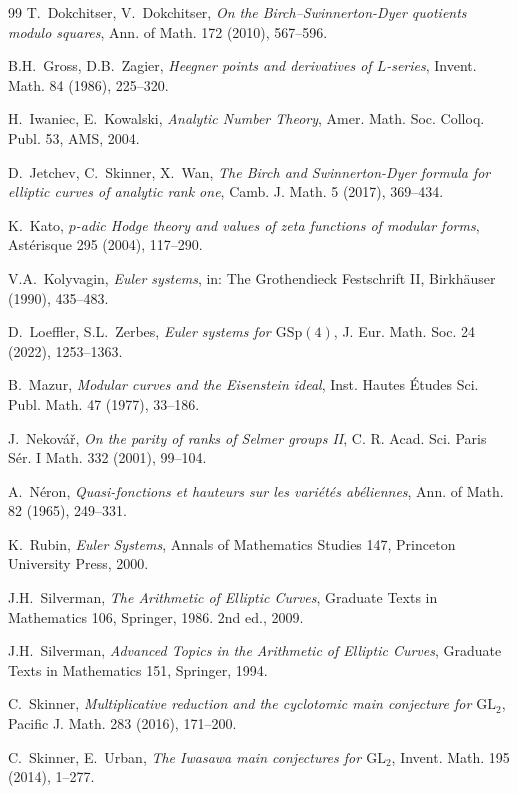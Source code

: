 \documentclass[11pt]{article}
\begin{document}
\begin{thebibliography}{99}
T.~Dokchitser, V.~Dokchitser,
\textit{On the Birch--Swinnerton-Dyer quotients modulo squares},
Ann. of Math. 172 (2010), 567--596.

B.H.~Gross, D.B.~Zagier,
\textit{Heegner points and derivatives of $L$-series},
Invent. Math. 84 (1986), 225--320.

H.~Iwaniec, E.~Kowalski,
\textit{Analytic Number Theory},
Amer. Math. Soc. Colloq. Publ. 53, AMS, 2004.

D.~Jetchev, C.~Skinner, X.~Wan,
\textit{The Birch and Swinnerton-Dyer formula for elliptic curves of analytic
rank one},
Camb. J. Math. 5 (2017), 369--434.

K.~Kato,
\textit{$p$-adic Hodge theory and values of zeta functions of modular
forms},
Ast\'erisque 295 (2004), 117--290.

V.A.~Kolyvagin,
\textit{Euler systems},
in: The Grothendieck Festschrift II,
Birkh\"auser (1990), 435--483.

D.~Loeffler, S.L.~Zerbes,
\textit{Euler systems for $\mathrm{GSp}(4)$},
J. Eur. Math. Soc. 24 (2022), 1253--1363.

B.~Mazur,
\textit{Modular curves and the Eisenstein ideal},
Inst. Hautes \'Etudes Sci. Publ. Math. 47 (1977), 33--186.

J.~Nekov\'a\v{r},
\textit{On the parity of ranks of Selmer groups II},
C. R. Acad. Sci. Paris S\'er. I Math. 332 (2001), 99--104.

A.~N\'eron,
\textit{Quasi-fonctions et hauteurs sur les vari\'et\'es ab\'eliennes},
Ann. of Math. 82 (1965), 249--331.

K.~Rubin,
\textit{Euler Systems},
Annals of Mathematics Studies 147, Princeton University Press, 2000.

J.H.~Silverman,
\textit{The Arithmetic of Elliptic Curves},
Graduate Texts in Mathematics 106, Springer, 1986.
2nd ed., 2009.

J.H.~Silverman,
\textit{Advanced Topics in the Arithmetic of Elliptic Curves},
Graduate Texts in Mathematics 151, Springer, 1994.

C.~Skinner,
\textit{Multiplicative reduction and the cyclotomic main conjecture for
$\mathrm{GL}_2$},
Pacific J. Math. 283 (2016), 171--200.

C.~Skinner, E.~Urban,
\textit{The Iwasawa main conjectures for $\mathrm{GL}_2$},
Invent. Math. 195 (2014), 1--277.


\end{thebibliography}
\end{document}
